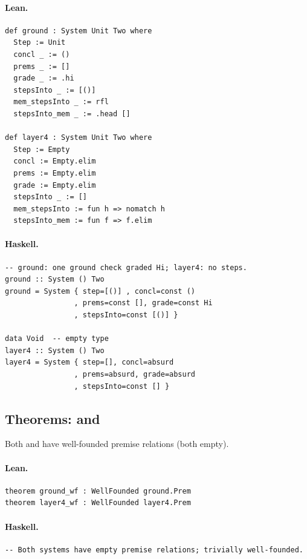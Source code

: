 \documentclass[11pt,a4paper]{article}
\begin{document}
\paragraph{Lean.}
\begin{lstlisting}[style=lean]
def ground : System Unit Two where
  Step := Unit
  concl _ := ()
  prems _ := []
  grade _ := .hi
  stepsInto _ := [()]
  mem_stepsInto _ := rfl
  stepsInto_mem _ := .head []

def layer4 : System Unit Two where
  Step := Empty
  concl := Empty.elim
  prems := Empty.elim
  grade := Empty.elim
  stepsInto _ := []
  mem_stepsInto := fun h => nomatch h
  stepsInto_mem := fun f => f.elim
\end{lstlisting}

\paragraph{Haskell.}
\begin{lstlisting}[style=haskell]
-- ground: one ground check graded Hi; layer4: no steps.
ground :: System () Two
ground = System { step=[()] , concl=const ()
                , prems=const [], grade=const Hi
                , stepsInto=const [()] }

data Void  -- empty type
layer4 :: System () Two
layer4 = System { step=[], concl=absurd
                , prems=absurd, grade=absurd
                , stepsInto=const [] }
\end{lstlisting}


\subsection{Theorems:  and }

\begin{thm}
Both  and  have well-founded premise relations
(both empty).
\end{thm}

\paragraph{Lean.}
\begin{lstlisting}[style=lean]
theorem ground_wf : WellFounded ground.Prem
theorem layer4_wf : WellFounded layer4.Prem
\end{lstlisting}

\paragraph{Haskell.}
\begin{lstlisting}[style=haskell]
-- Both systems have empty premise relations; trivially well-founded.
\end{lstlisting}
\end{document}
